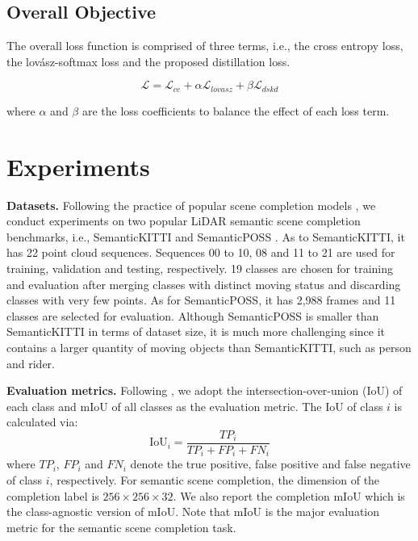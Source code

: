 \documentclass[10pt,twocolumn,letterpaper]{article}
\begin{document}
\subsection{Overall Objective}

The overall loss function is comprised of three terms, i.e., the cross entropy loss, the lovász-softmax loss \cite{jensbehley2017} and the proposed distillation loss.

\begin{equation}
  \mathcal{L} = \mathcal{L}_{ce} + \alpha \mathcal{L}_{lovasz} + \beta \mathcal{L}_{dskd}
  \label{eq:total_loss}
\end{equation}

where $\alpha$ and $\beta$ are the loss coefficients to balance the effect of each loss term.


\section{Experiments}

\textbf{Datasets.}
Following the practice of popular scene completion models \cite{diederikpkingma2015}, we conduct experiments on two popular LiDAR semantic scene completion benchmarks, i.e., SemanticKITTI \cite{zehaohuang} and SemanticPOSS \cite{adrianaromero2019}. As to SemanticKITTI, it has 22 point cloud sequences. Sequences 00 to 10, 08 and 11 to 21 are used for training, validation and testing, respectively. 19 classes are chosen for training and evaluation after merging classes with distinct moving status and discarding classes with very few points. As for SemanticPOSS, it has 2,988 frames and 11 classes are selected for evaluation. Although SemanticPOSS is smaller than SemanticKITTI in terms of dataset size, it is much more challenging since it contains a larger quantity of moving objects than SemanticKITTI, such as person and rider.

\textbf{Evaluation metrics.}
Following \cite{luisroldao2018}, we adopt the intersection-over-union (IoU) of each class and mIoU of all classes as the evaluation metric. The IoU of class $i$ is calculated via:
\[
  \text{IoU}_i = \frac{TP_i}{TP_i + FP_i + FN_i}
\]
where $TP_i$, $FP_i$ and $FN_i$ denote the true positive, false positive and false negative of class $i$, respectively. For semantic scene completion, the dimension of the completion label is $256\times256\times32$. We also report the completion mIoU which is the class-agnostic version of mIoU. Note that mIoU is the major evaluation metric for the semantic scene completion task.
\end{document}
